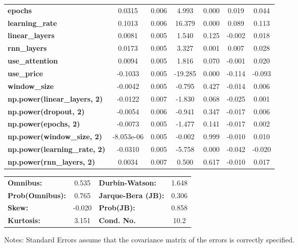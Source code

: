 \begin{center}
\begin{tabular}{lcccccc}
\textbf{epochs}                            &       0.0315  &        0.006     &     4.993  &         0.000        &        0.019    &        0.044     \\
\textbf{learning\_rate}                    &       0.1013  &        0.006     &    16.379  &         0.000        &        0.089    &        0.113     \\
\textbf{linear\_layers}                    &       0.0081  &        0.005     &     1.540  &         0.125        &       -0.002    &        0.018     \\
\textbf{rnn\_layers}                       &       0.0173  &        0.005     &     3.327  &         0.001        &        0.007    &        0.028     \\
\textbf{use\_attention}                    &       0.0094  &        0.005     &     1.816  &         0.070        &       -0.001    &        0.020     \\
\textbf{use\_price}                        &      -0.1033  &        0.005     &   -19.285  &         0.000        &       -0.114    &       -0.093     \\
\textbf{window\_size}                      &      -0.0042  &        0.005     &    -0.795  &         0.427        &       -0.014    &        0.006     \\
\textbf{np.power(linear\_layers, 2)}       &      -0.0122  &        0.007     &    -1.830  &         0.068        &       -0.025    &        0.001     \\
\textbf{np.power(dropout, 2)}              &      -0.0054  &        0.006     &    -0.941  &         0.347        &       -0.017    &        0.006     \\
\textbf{np.power(epochs, 2)}               &      -0.0073  &        0.005     &    -1.477  &         0.141        &       -0.017    &        0.002     \\
\textbf{np.power(window\_size, 2)}         &   -8.053e-06  &        0.005     &    -0.002  &         0.999        &       -0.010    &        0.010     \\
\textbf{np.power(learning\_rate, 2)}       &      -0.0310  &        0.005     &    -5.758  &         0.000        &       -0.042    &       -0.020     \\
\textbf{np.power(rnn\_layers, 2)}          &       0.0034  &        0.007     &     0.500  &         0.617        &       -0.010    &        0.017     \\
\bottomrule
\end{tabular}
\begin{tabular}{lclc}
\textbf{Omnibus:}       &  0.535 & \textbf{  Durbin-Watson:     } &    1.648  \\
\textbf{Prob(Omnibus):} &  0.765 & \textbf{  Jarque-Bera (JB):  } &    0.306  \\
\textbf{Skew:}          & -0.020 & \textbf{  Prob(JB):          } &    0.858  \\
\textbf{Kurtosis:}      &  3.151 & \textbf{  Cond. No.          } &     10.2  \\
\bottomrule
\end{tabular}
\end{center}

Notes: \newline
 [1] Standard Errors assume that the covariance matrix of the errors is correctly specified.